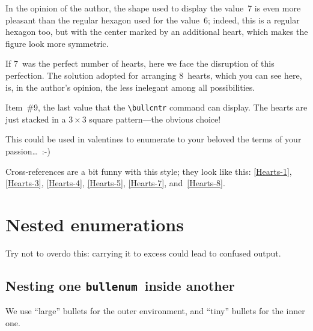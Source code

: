 \documentclass[a4paper]{article}
\DeclareRobustCommand*{\env}[1]{\texttt{#1}}
\newcommand*{\Bullenum}{bullenum}
\newcommand*{\beenv}{\env{\Bullenum}}
\begin{document}
\begin{bullenum}
	\item\label{Hearts-7}
		In the opinion of the author, the shape used to display the
		value~7 is even more pleasant than the regular hexagon used
		for the value~6; indeed, this is a regular hexagon too, but
		with the center marked by an additional heart, which makes the
		figure look more symmetric.

	\item\label{Hearts-8}
		If 7~was the perfect number of hearts, here we face the
		disruption of this perfection.  The solution adopted for
		arranging 8~hearts, which you can see here, is, in the
		author's opinion, the less inelegant among all possibilities.

	\item
		Item~\#9, the last value that the \verb|\bullcntr| command can
		display.  The hearts are just stacked in a $3\times3$ square
		pattern---the obvious choice!
\end{bullenum}

This could be used in valentines to enumerate to your beloved the
terms of your passion\ldots~:-)

Cross-references are a bit funny with this style; they look like this:
\ref{Hearts-1}, \ref{Hearts-3}, \ref{Hearts-4}, \ref{Hearts-5},
\ref{Hearts-7}, and~\ref{Hearts-8}.



\section{Nested enumerations}

Try not to overdo this: carrying it to excess could lead to confused
output.



\subsection{Nesting one \beenv\ inside another}
\label{SS:NestBullBull}

We use ``large'' bullets for the outer environment, and ``tiny''
bullets for the inner one.
\end{document}
